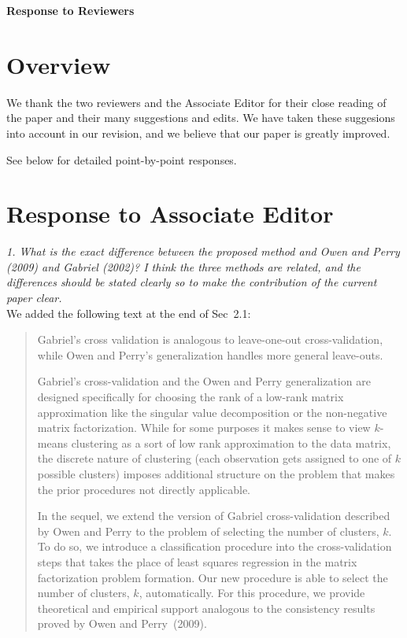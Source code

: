 \documentclass[11pt]{article}
\begin{document}
\begin{center}\textbf{\LARGE Response to Reviewers}
\end{center}

\section{Overview}

We thank the two reviewers and the Associate Editor for their close reading of
the paper and their many suggestions and edits. We have taken these suggesions
into account in our revision, and we believe that our paper is greatly
improved.

See below for detailed point-by-point responses.


\section{Response to Associate Editor}

\noindent
\emph{1. What is the exact difference between the proposed method and Owen and
Perry (2009) and Gabriel (2002)? I think the three methods are related, and
the differences should be stated clearly so to make the contribution of the
current paper clear.}
\\

We added the following text at the end of Sec~2.1:

\begin{quote}
Gabriel's cross validation is analogous to leave-one-out cross-validation,
while Owen and Perry's generalization handles more general leave-outs.

Gabriel's cross-validation and the Owen and Perry generalization are designed
specifically for choosing the rank of a low-rank matrix approximation like the
singular value decomposition or the non-negative matrix factorization. While
for some purposes it makes sense to view $k$-means clustering as a sort of low
rank approximation to the data matrix, the discrete nature of clustering (each
observation gets assigned to one of $k$ possible clusters) imposes additional
structure on the problem that makes the prior procedures not directly
applicable.

In the sequel, we extend the version of Gabriel cross-validation described by
Owen and Perry to the problem of selecting the number of clusters, $k$. To do
so, we introduce a classification procedure into the cross-validation steps
that takes the place of least squares regression in the matrix factorization
problem formation. Our new procedure is able to select the number of clusters,
$k$, automatically. For this procedure, we provide theoretical and empirical
support analogous to the consistency results proved by Owen and Perry~(2009).
\end{quote}
\end{document}
